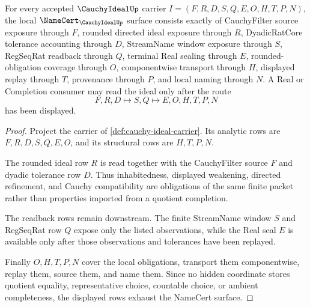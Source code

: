 \begin{theorem}
\label{thm:cauchy-ideal-namecert-obligations}
For every accepted $\CauchyIdealUp$ carrier $I=(F,R,D,S,Q,E,O,H,T,P,N)$, the local $\NameCert_{\CauchyIdealUp}$ surface consists exactly of CauchyFilter source exposure through $F$, rounded directed ideal exposure through $R$, DyadicRatCore tolerance accounting through $D$, StreamName window exposure through $S$, RegSeqRat readback through $Q$, terminal Real sealing through $E$, rounded-obligation coverage through $O$, componentwise transport through $H$, displayed replay through $T$, provenance through $P$, and local naming through $N$. A Real or Completion consumer may read the ideal only after the route
$$
F,R,D \longmapsto S,Q \longmapsto E,O,H,T,P,N
$$
has been displayed.
\end{theorem}
\begin{proof}
Project the carrier of \autoref{def:cauchy-ideal-carrier}. Its analytic rows are $F,R,D,S,Q,E,O$, and its structural rows are $H,T,P,N$.

The rounded ideal row $R$ is read together with the CauchyFilter source $F$ and dyadic tolerance row $D$. Thus inhabitedness, displayed weakening, directed refinement, and Cauchy compatibility are obligations of the same finite packet rather than properties imported from a quotient completion.

The readback rows remain downstream. The finite StreamName window $S$ and RegSeqRat row $Q$ expose only the listed observations, while the Real seal $E$ is available only after those observations and tolerances have been replayed.

Finally $O,H,T,P,N$ cover the local obligations, transport them componentwise, replay them, source them, and name them. Since no hidden coordinate stores quotient equality, representative choice, countable choice, or ambient completeness, the displayed rows exhaust the NameCert surface.
\end{proof}

